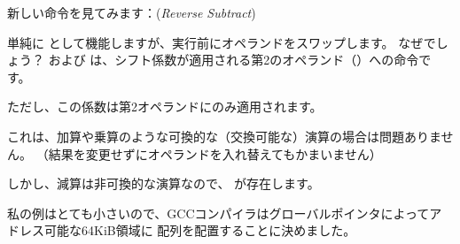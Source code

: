 新しい命令を見てみます：\RSB (\emph{Reverse Subtract})

単純に \SUB として機能しますが、実行前にオペランドをスワップします。
なぜでしょう？
\SUB および \RSB は、シフト係数が適用される第2のオペランド（）への命令です。

ただし、この係数は第2オペランドにのみ適用されます。

これは、加算や乗算のような可換的な（交換可能な）演算の場合は問題ありません。
（結果を変更せずにオペランドを入れ替えてもかまいません）

しかし、減算は非可換的な演算なので、 \RSB が存在します。


私の例はとても小さいので、GCCコンパイラはグローバルポインタによってアドレス可能な64KiB領域に
配列を配置することに決めました。



